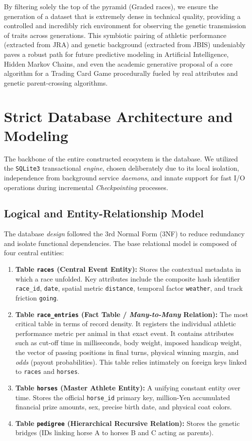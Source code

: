 \documentclass[12pt,a4paper]{article}
\begin{document}
By filtering solely the top of the pyramid (Graded races), we ensure the generation of a dataset that is extremely dense in technical quality, providing a controlled and incredibly rich environment for observing the genetic transmission of traits across generations. This symbiotic pairing of athletic performance (extracted from JRA) and genetic background (extracted from JBIS) undeniably paves a robust path for future predictive modeling in Artificial Intelligence, Hidden Markov Chains, and even the academic generative proposal of a core algorithm for a Trading Card Game procedurally fueled by real attributes and genetic parent-crossing algorithms.

\section{Strict Database Architecture and Modeling}
The backbone of the entire constructed ecosystem is the database. We utilized the \texttt{SQLite3} transactional \textit{engine}, chosen deliberately due to its local isolation, independence from background service \textit{daemons}, and innate support for fast I/O operations during incremental \textit{Checkpointing} processes.

\subsection{Logical and Entity-Relationship Model}
The database \textit{design} followed the 3rd Normal Form (3NF) to reduce redundancy and isolate functional dependencies. The base relational model is composed of four central entities:
\begin{enumerate}
    \item \textbf{Table \texttt{races} (Central Event Entity):}
    Stores the contextual metadata in which a race unfolded. Key attributes include the composite hash identifier \texttt{race\_id}, \texttt{date}, spatial metric \texttt{distance}, temporal factor \texttt{weather}, and track friction \texttt{going}.
    \item \textbf{Table \texttt{race\_entries} (Fact Table / \textit{Many-to-Many} Relation):}
    The most critical table in terms of record density. It registers the individual athletic performance metric per animal in that exact event. It contains attributes such as cut-off time in milliseconds, body weight, imposed handicap weight, the vector of passing positions in final turns, physical winning margin, and \textit{odds} (payout probabilities). This table relies intimately on foreign keys linked to \texttt{races} and \texttt{horses}.
    \item \textbf{Table \texttt{horses} (Master Athlete Entity):}
    A unifying constant entity over time. Stores the official \texttt{horse\_id} primary key, million-Yen accumulated financial prize amounts, sex, precise birth date, and physical coat colors.
    \item \textbf{Table \texttt{pedigree} (Hierarchical Recursive Relation):}
    Stores the genetic bridges (IDs linking horse A to horses B and C acting as parents).
\end{enumerate}
\end{document}
